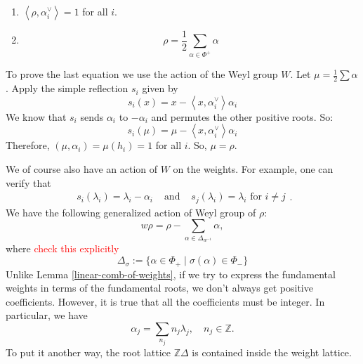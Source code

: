 \begin{enumerate}
    \item $\left\langle\rho,\alpha_i^\vee\right\rangle = 1$ for all $i$.
    \item
          \[
              \rho = \frac{1}{2} \sum_{\alpha \in \Phi^+} \alpha
          \]
\end{enumerate}

To prove the last equation we use the action of the Weyl group $W$. Let $\mu = \frac{1}{2} \sum \alpha$. Apply the simple reflection $s_i$ given by
\[
    s_i(x) = x - \left\langle x, \alpha_i^\vee\right\rangle \alpha_i
\]
We know that $s_i$ sends $\alpha_i$ to $-\alpha_i$ and permutes the other positive roots. So:
\[
    s_i(\mu) = \mu -  \left\langle x, \alpha_i^\vee\right\rangle  \alpha_i
\]
Therefore, $(\mu, \alpha_i) = \mu(h_i) = 1$ for all $i$. So, $\mu = \rho$.

We of course also have an action of $W$ on the weights.  For example, one can verify that
\[ \begin{array}{lcr} s_i(\lambda_i) = \lambda_i - \alpha_i & \text{ and } & s_j(\lambda_i) = \lambda_i \mbox{ for } i \neq j \end{array}.\]
We have the following generalized action of Weyl group of $\rho$:
\[ w \rho = \rho - \sum_{\alpha \in \Delta_{w^{-1}}} \alpha,\]
where \textcolor{red}{check this explicitly}
\[\Delta_{\sigma}:= \{ \alpha \in \Phi_+ \mid \sigma(\alpha) \in \Phi_- \}\]
Unlike Lemma \ref{linear-comb-of-weights}, if we try to express the fundamental weights in terms of the fundamental roots, we don't always
get positive coefficients. However, it is true that all the coefficients must be integer. In particular, we have
\[\alpha_j = \sum_{n_j}n_j\lambda_j, \quad n_j \in \mathbb{Z}.\]
To put it another way, the root lattice $\mathbb{Z}\Delta$ is contained inside the weight lattice.



